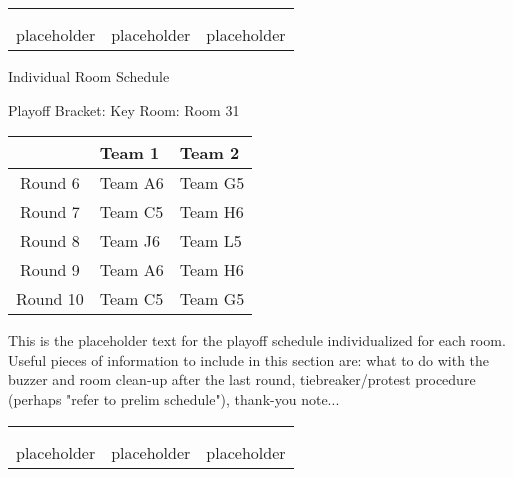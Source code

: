 \documentclass{article}%
\begin{document}
%
\begin{tabularx}{\textwidth}{YYY}%
  &  &  \\%
\\%
placeholder&placeholder&placeholder\\%
\end{tabularx}%
\newpage%
\begin{center}%
\begin{Huge}%
Individual Room Schedule%
\end{Huge}%
\vspace*{16pt}%
\linebreak%
\begin{Large}%
Playoff Bracket: Key \hfill Room: Room 31%
\end{Large}%
\end{center}%
%
\begin{tabularx}{\textwidth}{|c|Y|Y|}%
\hline%
&Team 1&Team 2\\%
\hline%
Round 6&Team A6&Team G5\\%
Round 7&Team C5&Team H6\\%
Round 8&Team J6&Team L5\\%
Round 9&Team A6&Team H6\\%
Round 10&Team C5&Team G5\\%
\hline%
\end{tabularx}%
\vspace*{16pt}%
\linebreak%
This is the placeholder text for the playoff schedule individualized for each room. Useful pieces of information to include in this section are: what to do with the buzzer and room clean{-}up after the last round, tiebreaker/protest procedure (perhaps "refer to prelim schedule"), thank{-}you note...%
\vspace*{30pt}%
\newline%
%
\begin{tabularx}{\textwidth}{YYY}%
  &  &  \\%
\\%
placeholder&placeholder&placeholder\\%
\end{tabularx}%
\end{document}
